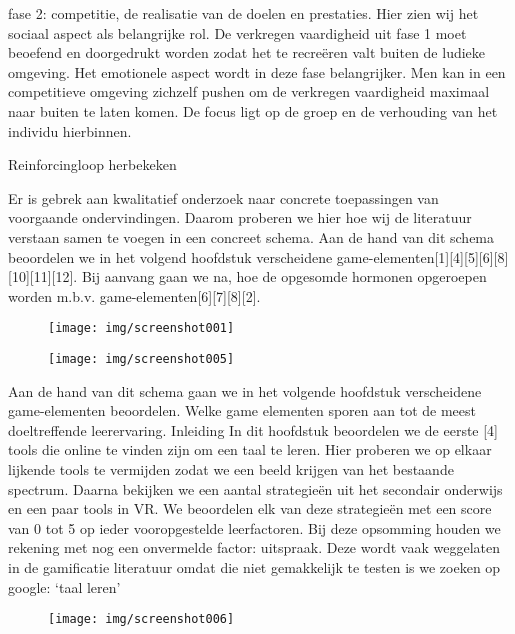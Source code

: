 \documentclass{hogent-article}
\begin{document}
    fase 2: competitie, de realisatie van de doelen en prestaties.
    Hier zien wij het sociaal aspect als belangrijke rol. De verkregen vaardigheid uit fase 1 moet beoefend en doorgedrukt worden zodat het te recreëren valt buiten de ludieke omgeving. Het emotionele aspect wordt in deze fase belangrijker. Men kan in een competitieve omgeving zichzelf pushen om de verkregen vaardigheid maximaal naar buiten te laten komen. De focus ligt op de groep en de verhouding van het individu hierbinnen.

Reinforcingloop herbekeken

Er is gebrek aan kwalitatief onderzoek naar concrete toepassingen van voorgaande ondervindingen. Daarom proberen we hier hoe wij de literatuur verstaan samen te voegen in een concreet schema. Aan de hand van dit schema beoordelen we in het volgend hoofdstuk verscheidene game-elementen[1][4][5][6][8][10][11][12].
Bij aanvang gaan we na, hoe de opgesomde hormonen opgeroepen worden m.b.v. game-elementen[6][7][8][2].

\begin{figure}
    \centering
    \texttt{[image: img/screenshot001]}
    \caption{}
    \label{fig:screenshot001}
\end{figure}

\begin{figure}
    \centering
    \texttt{[image: img/screenshot005]}
    \caption{}
    \label{fig:screenshot005}
\end{figure}

Aan de hand van dit schema gaan we in het volgende hoofdstuk verscheidene game-elementen beoordelen.
Welke game elementen sporen aan tot de meest doeltreffende leerervaring.
Inleiding
In dit hoofdstuk beoordelen we de eerste [4] tools die online te vinden zijn om een taal te leren. Hier proberen we op elkaar lijkende tools te vermijden zodat we een beeld krijgen van het bestaande spectrum. Daarna bekijken we een aantal strategieën uit het secondair onderwijs en een paar tools in VR. We beoordelen elk van deze strategieën met een score van 0 tot 5 op ieder vooropgestelde leerfactoren. Bij deze opsomming houden we rekening met nog een onvermelde factor: uitspraak. Deze wordt vaak weggelaten in de gamificatie literatuur omdat die niet gemakkelijk te testen is we zoeken op google: ‘taal leren’ 

\begin{figure}
    \centering
    \texttt{[image: img/screenshot006]}
    \caption{}
    \label{fig:screenshot006}
\end{figure}
\end{document}
